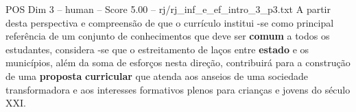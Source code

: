 \begin{textsample}{POS Dim 3 – human – Score 5.00 – rj/rj\_inf\_e\_ef\_intro\_3\_p3.txt}  \label{ex:f3_pos_016}
A partir desta perspectiva e compreensão de que o currículo institui -se como principal referência de um conjunto de conhecimentos que deve ser \textbf{comum} a todos os estudantes, considera -se que o estreitamento de laços entre \textbf{estado} e os municípios, além da soma de esforços nesta direção, contribuirá para a construção de uma \textbf{proposta} \textbf{curricular} que atenda aos anseios de uma sociedade transformadora e aos interesses formativos plenos para crianças e jovens do século XXI.

\end{textsample}

